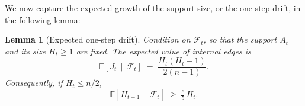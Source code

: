 \documentclass[
    aps,
    superscriptaddress,
    onecolumn,
    10pt,
    prx,
    nofootinbib
]{revtex4-2}
\newtheorem{lemma}{Lemma}
\theoremstyle{namedstatement}
\theoremstyle{plain}
\begin{document}
We now capture the expected growth of the support size, or the one-step drift, in the following lemma:

\begin{lemma}[Expected one-step drift]
\label{lem:drift}
Condition on $\mathcal{F}_t$, so that the support $A_t$ and its size $H_t \geq 1$ are fixed. The expected value of internal edges is
\begin{equation}
\label{eq:internal-edges}
    \mathbb{E}\!\left[ J_t \,\middle|\, \mathcal{F}_t \right] \;=\; \frac{H_t (H_t - 1)}{2(n-1)} .
\end{equation}
Consequently, if $H_t \leq n/2$,
\begin{equation}
\label{eq:drift-heuristic}
    \mathbb{E}\!\left[ H_{t+1} \,\middle|\, \mathcal{F}_t \right] \;\geq\; \tfrac{6}{5}\, H_t .
\end{equation}
\end{lemma}
 
\end{document}
